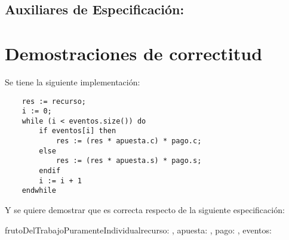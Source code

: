 \documentclass[10pt,a4paper]{article}
\begin{document}
\subsection{Auxiliares de Especificación:}

	{
	}

	{
	}
	{
	}

\section{Demostraciones de correctitud}

 Se tiene la siguiente implementación:
   
\vspace{0.3cm}
   
\begin{lstlisting}
	res := recurso;
	i := 0;
	while (i < eventos.size()) do
		if eventos[i] then
			res := (res * apuesta.c) * pago.c;
		else
			res := (res * apuesta.s) * pago.s;
		endif
		i := i + 1
	endwhile
\end{lstlisting}
   
\vspace{0.3cm}
   
 Y se quiere demostrar que es correcta respecto de la siguiente especificación:
\begin{proc}{frutoDelTrabajoPuramenteIndividual}{\In recurso: \float, \In apuesta: , \In pago: , \In eventos: \TLista{\bool} }{\float}
   
   
   
\end{proc}
   
\vspace{0.3cm}
   
\end{document}
